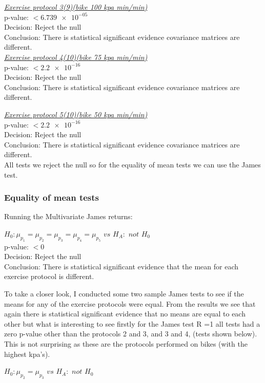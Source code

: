 \documentclass[a4paper]{article}
\begin{document}

\underline{\textit{Exercise protocol 3(9)(bike 100 kpa min/min)}}\\
p-value: $< \num{6.739e-05}$\\
Decision: Reject the null\\
Conclusion: There is statistical significant evidence covariance matrices 
are different.\\


\underline{\textit{Exercise protocol 4(10)(bike 75 kpa min/min)}}\\
p-value: $< \num{2.2e-16}$\\
Decision: Reject the null\\
Conclusion: There is statistical significant evidence covariance matrices 
are different.\\

\newpage  

\underline{\textit{Exercise protocol 5(10)(bike 50
kpa min/min)}}\\
p-value: $< \num{2.2e-16}$\\
Decision: Reject the null\\
Conclusion: There is statistical significant evidence covariance matrices 
are different.\\

All tests we reject the null so for the equality of mean tests we can use the James test.

\subsubsection{Equality of mean tests}

Running the Multivariate James returns:

$H_0 : \mu_{p_1} = \mu_{p_2} = \mu_{p_3} = \mu_{p_4}  = \mu_{p_5}$ $vs$ $H_A :$ $not$ $H_0$\\
p-value: $< \num{0}$\\
Decision: Reject the null\\
Conclusion: There is statistical significant evidence that the mean for each exercise protocol is different.\\
\newpage

To take a closer look, I conducted some two sample James tests to see if the means for any of the exercise protocols were equal. 
From the results we see that again there is statistical significant evidence that no means are equal to each other but what is interesting to see firstly for the James test R =1 all tests had a zero p-value other than the protocols 2 and 3, and 3 and 4, (tests shown below). This is not surprising as these are the protocols performed on bikes (with the highest kpa's). 

$H_0 : \mu_{p_2} = \mu_{p_3}$ $vs$ $H_A :$ $not$ $H_0$\\
\end{document}
